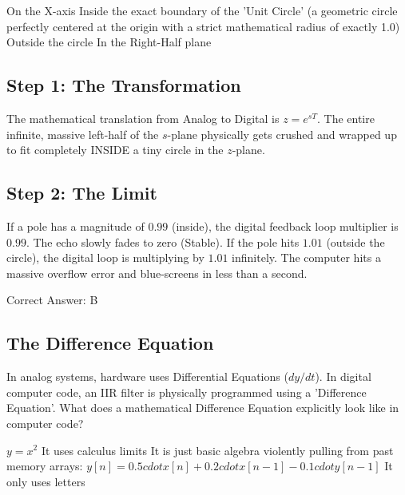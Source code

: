 \begin{choices}
    \choice On the X-axis
    \correctchoice Inside the exact boundary of the 'Unit Circle' (a geometric circle perfectly centered at the origin with a strict mathematical radius of exactly 1.0)
    \choice Outside the circle
    \choice In the Right-Half plane
\end{choices}

\begin{solution}

\subsection*{Step 1: The Transformation}
The mathematical translation from Analog to Digital is $z = e^{sT}$. The entire infinite, massive left-half of the $s$-plane physically gets crushed and wrapped up to fit completely INSIDE a tiny circle in the $z$-plane.

\subsection*{Step 2: The Limit}
If a pole has a magnitude of $0.99$ (inside), the digital feedback loop multiplier is $0.99$. The echo slowly fades to zero (Stable). If the pole hits $1.01$ (outside the circle), the digital loop is multiplying by $1.01$ infinitely. The computer hits a massive overflow error and blue-screens in less than a second.

Correct Answer: B
\end{solution}

\clearpage

\subsection{The Difference Equation}

In analog systems, hardware uses Differential Equations ($dy/dt$). In digital computer code, an IIR filter is physically programmed using a 'Difference Equation'. What does a mathematical Difference Equation explicitly look like in computer code?

\begin{choices}
    \choice $y = x^2$
    \choice It uses calculus limits
    \correctchoice It is just basic algebra violently pulling from past memory arrays: $y[n] = 0.5 cdot x[n] + 0.2 cdot x[n-1] - 0.1 cdot y[n-1]$
    \choice It only uses letters
\end{choices}

